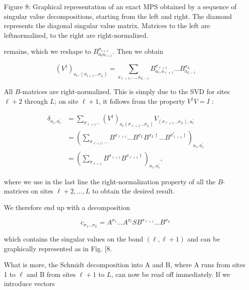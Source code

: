 \documentclass[12pt]{article}
\begin{document}
Figure 8: Graphical representation of an exact MPS obtained by a sequence of singular value decompositions, starting from the left and right. The diamond represents the diagonal singular value matrix. Matrices to the left are leftnormalized, to the right are right-normalized.

remains, which we reshape to $B_{a_{t} a_{t+1}}^{\sigma_{t+1}}$. Then we obtain


\begin{equation*}
\left(V^{\dagger}\right)_{a_{\ell},\left(\sigma_{t+1} \ldots \sigma_{L}\right)}=\sum_{a_{\ell+1}, \ldots, a_{L-1}} B_{a_{\ell}, a_{\ell+1}}^{\sigma_{\ell+1}} \ldots B_{a_{L-1}}^{\sigma_{L}} \tag{52}
\end{equation*}


All $B$-matrices are right-normalized. This is simply due to the SVD for sites $\ell+2$ through $L$; on site $\ell+1$, it follows from the property $V^{\dagger} V=I$ :

$$
\begin{aligned}
\delta_{a_{\ell}, a_{\ell}^{\prime}} & =\sum_{\sigma_{\ell+1} \ldots}\left(V^{\dagger}\right)_{a_{\ell}\left(\sigma_{\ell+1} \ldots \sigma_{L}\right)} V_{\left(\sigma_{\ell+1} \ldots \sigma_{L}\right), a_{\ell}^{\prime}} \\
& =\left(\sum_{\sigma_{\ell+1}, \ldots} B^{\sigma_{\ell+1}} \ldots B^{\sigma_{L}} B^{\sigma_{L} \dagger} \ldots B^{\sigma_{\ell+1}^{\dagger} \dagger}\right)_{a_{\ell}, a_{\ell}^{\prime}} \\
& =\left(\sum_{\sigma_{\ell+1}} B^{\sigma_{\ell+1}} B^{\sigma_{\ell+1} \dagger}\right)_{a_{\ell}, a_{\ell}^{\prime}},
\end{aligned}
$$

where we use in the last line the right-normalization property of all the $B$-matrices on sites $\ell+2, \ldots, L$ to obtain the desired result.

We therefore end up with a decomposition


\begin{equation*}
c_{\sigma_{1} \ldots \sigma_{L}}=A^{\sigma_{1}} \ldots A^{\sigma_{\ell}} S B^{\sigma_{\ell+1}} \ldots B^{\sigma_{L}} \tag{53}
\end{equation*}


which contains the singular values on the bond $(\ell, \ell+1)$ and can be graphically represented as in Fig. [8.

What is more, the Schmidt decomposition into A and B, where A runs from sites 1 to $\ell$ and B from sites $\ell+1$ to $L$, can now be read off immediately. If we introduce vectors
\end{document}
